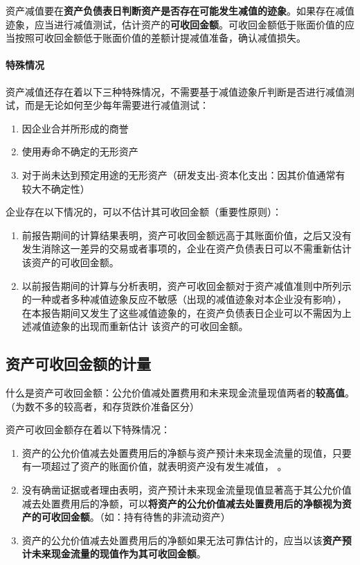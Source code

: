 \documentclass[UTF8,12pt]{ctexart}
\numberwithin{equation}{section} %
\numberwithin{figure}{section}
\numberwithin{table}{section}
\begin{document}
	资产减值要在\textbf{资产负债表日判断资产是否存在可能发生减值的迹象}。如果存在减值迹象，应当进行减值测试，估计资产的\textbf{可收回金额}。可收回金额低于账面价值的应当按照可收回金额低于账面价值的差额计提减值准备，确认减值损失。
	
	\paragraph{特殊情况}资产减值还存在着以下三种特殊情况，不需要基于减值迹象斤判断是否进行减值测试，而是无论如何至少每年需要进行减值测试：
	\begin{enumerate}
		\item 因企业合并所形成的商誉
		
		\item 使用寿命不确定的无形资产
		
		\item 对于尚未达到预定用途的无形资产（研发支出-资本化支出：因其价值通常有较大不确定性）
	\end{enumerate}
	
	企业存在以下情况的，可以不估计其可收回金额（重要性原则）：
	\begin{enumerate}
		\item 前报告期间的计算结果表明，资产可收回金额远高于其账面价值，之后又没有发生消除这一差异的交易或者事项的，企业在资产负债表日可以不需重新估计该资产的可收回金额。
		\item 以前报告期间的计算与分析表明，资产可收回金额对于资产减值准则中所列示的一种或者多种减值迹象反应不敏感（出现的减值迹象对本企业没有影响），在本报告期间又发生了这些减值迹象的，在资产负债表日企业可以不需因为上述减值迹象的出现而重新估计  该资产的可收回金额。
	\end{enumerate}
	
	\subsection{资产可收回金额的计量}
	什么是资产可收回金额：公允价值减处置费用和未来现金流量现值两者的\textbf{较高值}。（为数不多的较高者，和存货跌价准备区分）
	
	资产可收回金额存在着以下特殊情况：
	\begin{enumerate}
		\item 资产的公允价值减去处置费用后的净额与资产预计未来现金流量的现值，只要有一项超过了资产的账面价值，就表明资产没有发生减值，\textbf{ }。
		\item 没有确凿证据或者理由表明，资产预计未来现金流量现值显著高于其公允价值减去处置费用后的净额，可以\textbf{将资产的公允价值减去处置费用后的净额视为资产的可收回金额}。（如：持有待售的非流动资产）
		\item 资产的公允价值减去处置费用后的净额如果无法可靠估计的，应当以该\textbf{资产预计未来现金流量的现值作为其可收回金额}。
		
	\end{enumerate}
	
\end{document}
